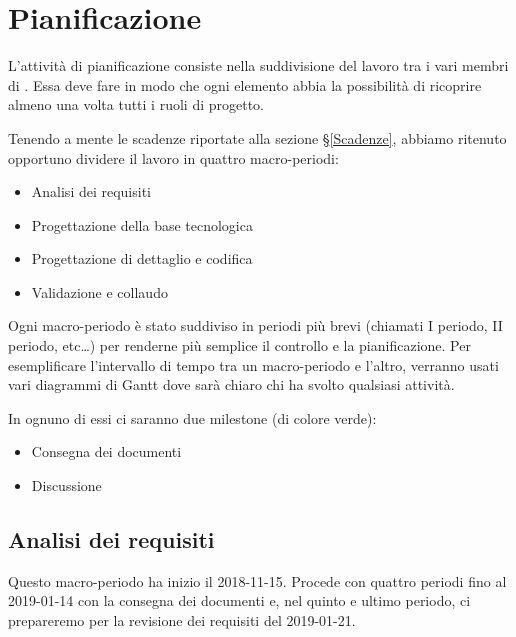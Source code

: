 \newpage
\section{Pianificazione}\label{Pianificazione}
	L'attività di pianificazione consiste nella suddivisione del lavoro tra i vari membri di \gruppo.
	Essa deve fare in modo che ogni elemento abbia la possibilità di ricoprire almeno una volta tutti i ruoli di progetto.

    Tenendo a mente le scadenze riportate alla sezione \S\ref{Scadenze}, abbiamo ritenuto opportuno dividere il lavoro in quattro macro-periodi:
	\begin{itemize}
	\item Analisi dei requisiti
	\item Progettazione della base tecnologica
	\item Progettazione di dettaglio e codifica
	\item Validazione e collaudo
	\end{itemize}

	Ogni macro-periodo è stato suddiviso in periodi più brevi (chiamati I periodo, II periodo, etc\dots) per renderne più semplice il
    controllo e la pianificazione. Per esemplificare l'intervallo di tempo tra un macro-periodo e l'altro, verranno usati vari
    diagrammi di Gantt dove sarà chiaro chi ha svolto qualsiasi attività.

    In ognuno di essi ci saranno due milestone (di colore verde):

    \begin{itemize}
    	\item Consegna dei documenti
    	\item Discussione
    \end{itemize}

    \subsection{Analisi dei requisiti}\label{PianificazioneAnalisiDeiRequisiti}
        Questo macro-periodo ha inizio il 2018-11-15. Procede con quattro periodi fino al 2019-01-14 con la consegna dei documenti e, nel
        quinto e ultimo periodo, ci prepareremo per la revisione dei requisiti del 2019-01-21.


